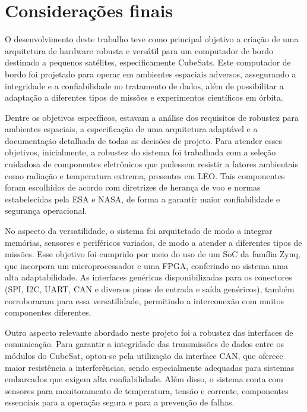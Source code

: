 \chapter{Considerações finais}
O desenvolvimento deste trabalho teve como principal objetivo a criação de uma arquitetura de hardware robusta e versátil para um computador de bordo destinado a pequenos satélites, especificamente CubeSats. Este computador de bordo foi projetado para operar em ambientes espaciais adversos, assegurando a integridade e a confiabilidade no tratamento de dados, além de possibilitar a adaptação a diferentes tipos de missões e experimentos científicos em órbita.

Dentre os objetivos específicos, estavam a análise dos requisitos de robustez para ambientes espaciais, a especificação de uma arquitetura adaptável e a documentação detalhada de todas as decisões de projeto. Para atender esses objetivos, inicialmente, a robustez do sistema foi trabalhada com a seleção cuidadosa de componentes eletrônicos que pudessem resistir a fatores ambientais como radiação e temperatura extrema, presentes em LEO. Tais componentes foram escolhidos de acordo com diretrizes de herança de voo e normas estabelecidas pela ESA e NASA, de forma a garantir maior confiabilidade e segurança operacional.

No aspecto da versatilidade, o sistema foi arquitetado de modo a integrar memórias, sensores e periféricos variados, de modo a atender a diferentes tipos de missões. Esse objetivo foi cumprido por meio do uso de um SoC da família Zynq, que incorpora um microprocessador e uma FPGA, conferindo ao sistema uma alta adaptabilidade. As interfaces genéricas disponibilizadas para os conectores (SPI, I2C, UART, CAN e diversos pinos de entrada e saída genéricos), também corroboraram para essa versatilidade, permitindo a interconexão com muitos componentes diferentes.

Outro aspecto relevante abordado neste projeto foi a robustez das interfaces de comunicação. Para garantir a integridade das transmissões de dados entre os módulos do CubeSat, optou-se pela utilização da interface CAN, que oferece maior resistência a interferências, sendo especialmente adequadas para sistemas embarcados que exigem alta confiabilidade. Além disso, o sistema conta com sensores para monitoramento de temperatura, tensão e corrente, componentes essenciais para a operação segura e para a prevenção de falhas.

